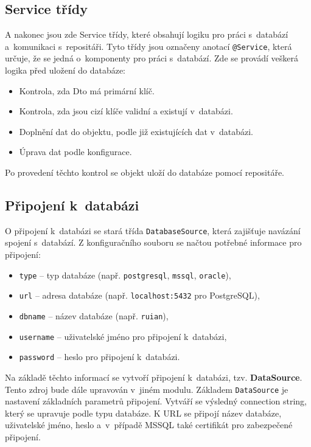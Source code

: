 \subsection{Service třídy}
\label{sec:serviceTridy}
A nakonec jsou zde Service třídy, které obsahují logiku pro práci s~databází a~komunikaci s~repositáři.
Tyto třídy jsou označeny anotací \texttt{@Service}, která určuje, že se jedná o~komponenty pro práci s~databází.
Zde se provádí veškerá logika před uložení do databáze:

\newpage

\begin{itemize}
    \item Kontrola, zda Dto má primární klíč.
    \item Kontrola, zda jsou cizí klíče validní a existují v~databázi.
    \item Doplnění dat do objektu, podle již existujících dat v~databázi.
    \item Úprava dat podle konfigurace.
\end{itemize}
Po provedení těchto kontrol se objekt uloží do databáze pomocí repositáře.

\subsection{Připojení k~databázi}
O připojení k~databázi se stará třída \texttt{DatabaseSource}, která zajišťuje navázání spojení s~databází.
Z konfiguračního souboru se načtou potřebné informace pro připojení:
\begin{itemize}
    \item \texttt{type} -- typ databáze (např. \texttt{postgresql}, \texttt{mssql}, \texttt{oracle}),
    \item \texttt{url} -- adresa databáze (např. \texttt{localhost:5432} pro PostgreSQL),
    \item \texttt{dbname} -- název databáze (např. \texttt{ruian}),
    \item \texttt{username} -- uživatelské jméno pro připojení k~databázi,
    \item \texttt{password} -- heslo pro připojení k~databázi.
\end{itemize}

Na základě těchto informací se vytvoří připojení k~databázi, tzv. \textbf{DataSource}.
Tento zdroj bude dále upravován v~jiném modulu.
Základem \texttt{DataSource} je nastavení základních parametrů připojení.
Vytváří se výsledný connection string, který se upravuje podle typu databáze.
K URL se připojí název databáze, uživatelské jméno, heslo a~v~případě MSSQL také certifikát pro zabezpečené připojení.

